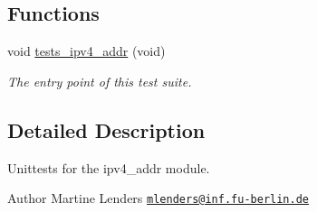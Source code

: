 \subsection*{Functions}
\begin{DoxyCompactItemize}
\item 
void \hyperlink{group__unittests_ga629b2fe7a5d7d0f1623fbb0859868246}{tests\+\_\+ipv4\+\_\+addr} (void)
\begin{DoxyCompactList}\small\item\em The entry point of this test suite. \end{DoxyCompactList}\end{DoxyCompactItemize}


\subsection{Detailed Description}
Unittests for the {\ttfamily ipv4\+\_\+addr} module. 

\begin{DoxyAuthor}{Author}
Martine Lenders \href{mailto:mlenders@inf.fu-berlin.de}{\tt mlenders@inf.\+fu-\/berlin.\+de} 
\end{DoxyAuthor}
